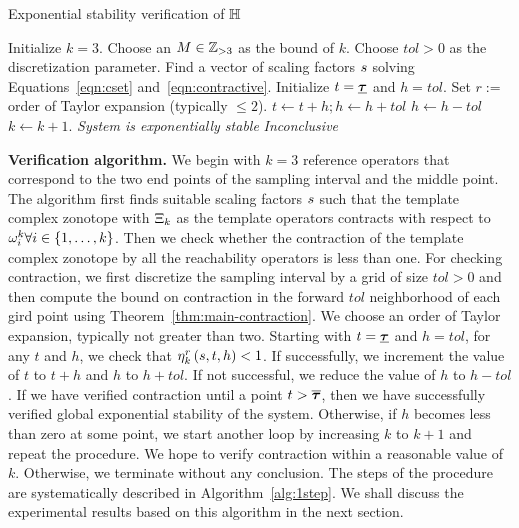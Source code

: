 %
 \begin{algorithm}
\caption{Exponential stability verification of $\mathbb{H}$}
\label{alg:1step}
\begin{algorithmic}[1]
\State Initialize $k=3$.
\State Choose an $M\in\mathbb{Z}_{>3}$ as the bound of $k$.
\State Choose $tol>0$ as
the discretization parameter.
\State Find a vector of scaling factors $s$ solving Equations~\ref{eqn:cset} and~\ref{eqn:contractive}.
\State Initialize $t=\bm{\underline{\tau}}$ and $h=tol$. 
\State Set $r:=$ order of Taylor
expansion (typically $\leq 2$).
\State $t\gets t+h; h\gets h+tol$
\Else
\State $h\gets h-tol$
\EndIf
{}
\State $k\gets k+1$.  
\EndIf
\EndWhile
\EndWhile
{}
\State \emph{System is exponentially stable}
\Else
\State \emph{Inconclusive}
\EndIf
\end{algorithmic}
 \end{algorithm}
%
{\bf Verification algorithm.} We begin with $k=3$ reference
 operators that correspond to the two end points of the sampling
 interval and the middle point.  The algorithm first finds suitable
 scaling factors $s$ such that the template complex zonotope with
 $\Xi_k$ as the template operators contracts with respect to
 $\omega_i^k\forall i\in\left\{1,\ldots,k\right\}$.  Then we check whether the
 contraction of the template complex zonotope by all the reachability
 operators is less than one. For checking contraction, we first
 discretize the sampling interval by a grid of size $tol>0$ and then
 compute the bound on contraction in the forward $tol$ neighborhood of
 each gird point using Theorem~\ref{thm:main-contraction}.  We choose
 an order of Taylor expansion, typically not greater than two.
 Starting with $t=\bm{\underline{\tau}}$ and $h=tol$, for any $t$ and $h$, we check
 that $\eta_{k}^{r}\left(s,t,h\right)<1$.  If successfully, we increment the
 value of $t$ to $t+h$ and $h$ to $h+tol$.  If not successful, we
 reduce the value of $h$ to $h-tol$.  If we have verified contraction
 until a point $t>\bm{\overline{\tau}}$, then we have successfully verified global
 exponential stability of the system.  Otherwise, if $h$ becomes less
 than zero at some point, we start another loop by increasing $k$ to
 $k+1$ and repeat the procedure.  We hope to verify contraction within
 a reasonable value of $k$.  Otherwise, we terminate without any
 conclusion.  The steps of the procedure are systematically described
 in Algorithm~\ref{alg:1step}.  We shall discuss the experimental results
 based on this algorithm in the next section.
%

